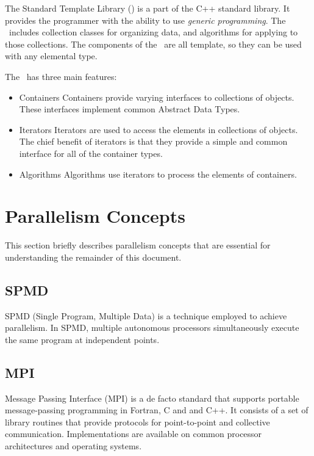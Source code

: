 \documentclass{report}
\begin{document}
The Standard Template Library (\stl) is a part of the C++ standard library.
It provides the programmer with the ability to use \emph{generic programming}.
The \stl\ includes collection classes for organizing data, and algorithms
for applying to those collections.  The components of the \stl\ are all
template, so they can be used with any elemental type.

The \stl\ has three main features:
\begin{itemize}
\item
Containers
\newline
Containers provide varying interfaces to collections of objects.
These interfaces implement common Abstract Data Types.
\item
Iterators
\newline
Iterators are used to access the elements in collections of objects.
The chief benefit of iterators is that they provide a simple and common
interface for all of the container types.
\item
Algorithms
\newline
Algorithms use iterators to process the elements of containers.
\end{itemize}


\section{Parallelism Concepts}

This section briefly describes parallelism concepts that are
essential for understanding the remainder of this document.

\subsection{SPMD}

SPMD (Single Program, Multiple Data)
is a technique employed to achieve parallelism.
In SPMD, multiple autonomous processors simultaneously execute
the same program at independent points.

\subsection{MPI}

Message Passing Interface (MPI) is a de facto standard that supports portable
message-passing programming in Fortran, C and and C++. It consists of a set
of library routines that provide protocols for point-to-point and collective
communication. Implementations are available on common processor architectures and operating systems.
\end{document}
